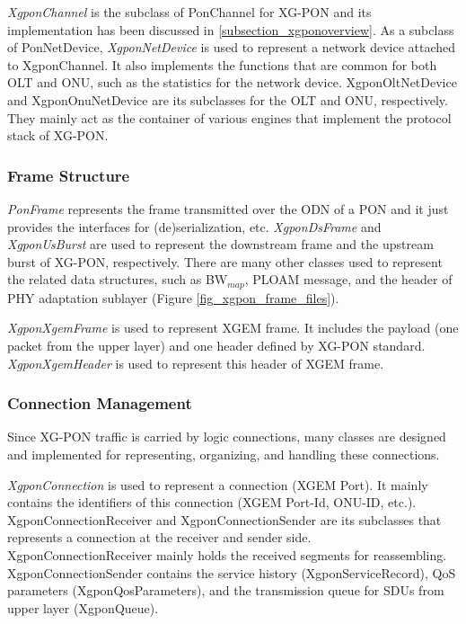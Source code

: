 \emph{XgponChannel} is the subclass of PonChannel for XG-PON and
its implementation has been discussed in
\ref{subsection_xgponoverview}. As a subclass of PonNetDevice,
\emph{XgponNetDevice} is used to represent a network device
attached to XgponChannel. It also implements the functions that
are common for both OLT and ONU, such as the statistics for the
network device. XgponOltNetDevice and XgponOnuNetDevice are its
subclasses for the OLT and ONU, respectively. They mainly act as
the container of various engines that implement the protocol stack
of XG-PON.

\subsubsection{Frame Structure}

\emph{PonFrame} represents the frame transmitted over the ODN of a
PON and it just provides the interfaces for (de)serialization,
etc. \emph{XgponDsFrame} and \emph{XgponUsBurst} are used to
represent the downstream frame and the upstream burst of XG-PON,
respectively. There are many other classes used to represent the
related data structures, such as BW$_{map}$, PLOAM message, and
the header of PHY adaptation sublayer (Figure \ref{fig_xgpon_frame_files}). 

\emph{XgponXgemFrame} is used to represent XGEM frame. It includes
the payload (one packet from the upper layer) and one header
defined by XG-PON standard. \emph{XgponXgemHeader} is used to
represent this header of XGEM frame.



\subsubsection{Connection Management}

Since XG-PON traffic is carried by logic connections, many classes
are designed and implemented for representing, organizing, and
handling these connections.

\emph{XgponConnection} is used to represent a connection (XGEM
Port). It mainly contains the identifiers of this connection (XGEM
Port-Id, ONU-ID, etc.). XgponConnectionReceiver and
XgponConnectionSender are its subclasses that represents a
connection at the receiver and sender side.
XgponConnectionReceiver mainly holds the received segments for
reassembling. XgponConnectionSender contains the service history
(XgponServiceRecord), QoS parameters (XgponQosParameters), and the
transmission queue for SDUs from upper layer (XgponQueue).

